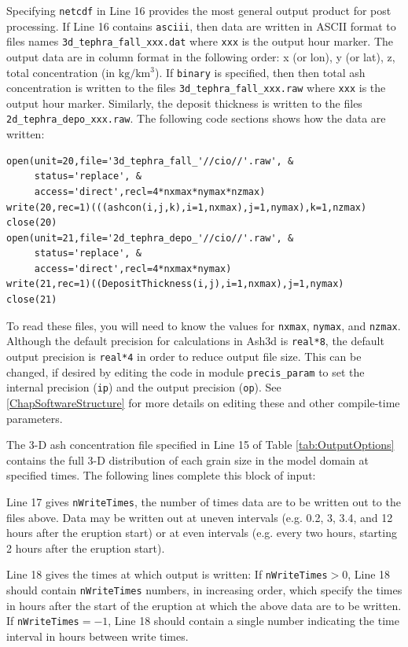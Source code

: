 Specifying \texttt{netcdf} in Line 16 provides the most general output product for post
processing.  If Line 16 contains \texttt{asciii}, then data are written in ASCII format
to files names \texttt{3d\_tephra\_fall\_xxx.dat} where \texttt{xxx} is the output hour marker.
The output data are in column format in the following order: x (or lon), y (or lat), z,
total concentration (in $\mathrm{kg/km^3}$).
If \texttt{binary} is specified, then then total ash concentration is written to the files
\texttt{3d\_tephra\_fall\_xxx.raw} where \texttt{xxx} is the output hour marker.
Similarly, the deposit thickness is written to the files \texttt{2d\_tephra\_depo\_xxx.raw}.
The following
code sections shows how the data are written:
\begin{verbatim}
open(unit=20,file='3d_tephra_fall_'//cio//'.raw', &
     status='replace', &
     access='direct',recl=4*nxmax*nymax*nzmax)
write(20,rec=1)(((ashcon(i,j,k),i=1,nxmax),j=1,nymax),k=1,nzmax)
close(20)
open(unit=21,file='2d_tephra_depo_'//cio//'.raw', &
     status='replace', &
     access='direct',recl=4*nxmax*nymax)
write(21,rec=1)((DepositThickness(i,j),i=1,nxmax),j=1,nymax)
close(21)
\end{verbatim}
To read these files, you will need to know the values for \texttt{nxmax},
\texttt{nymax}, and \texttt{nzmax}.  Although the default precision for
calculations in Ash3d is \texttt{real*8}, the default output precision is
\texttt{real*4} in order to reduce output file size.  This can be changed, if desired
by editing the code in module \texttt{precis\_param} to set the internal
precision (\texttt{ip}) and the output precision (\texttt{op}).
See \ref{ChapSoftwareStructure}
for more details on editing these and other compile-time parameters.

The 3-D ash concentration file specified in Line 15 of Table \ref{tab:OutputOptions}
contains the full
3-D distribution of each grain size in the model domain at specified times.
The following lines complete this block of input:

Line 17 gives \texttt{nWriteTimes}, the number of times data are to be written out to the
files above. Data may be written out at uneven intervals (e.g. 0.2, 3, 3.4, and
12 hours after the eruption start) or at even intervals (e.g. every two hours,
starting 2 hours after the eruption start).

Line 18 gives the times at which output is written:
If \texttt{nWriteTimes}$>0$, Line 18 should contain \texttt{nWriteTimes}
numbers, in increasing order,
which specify the times in hours after the start of the eruption at which the above
data are to be written.
If \texttt{nWriteTimes}$=-1$, Line 18 should contain a single number indicating the time
interval in hours between write times.

